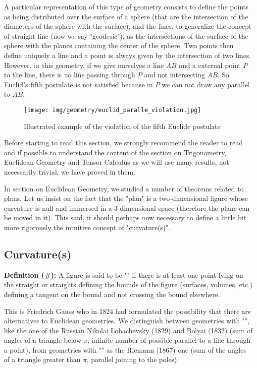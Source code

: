 	A particular representation of this type of geometry consists to define the points as being distributed over the surface of a sphere (that are the intersection of the diameters of the sphere with the surface), and the lines, to generalize the concept of straight line (now we say "geodesic"), as the intersections of the surface of the sphere with the planes containing the center of the sphere. Two points then define uniquely a line and a point is always given by the intersection of two lines. However, in this geometry, if we give ourselves a line $AB$ and a external point $P$ to the line, there is no line passing through $P$ and not intersecting $AB$. So Euclid's fifth postulate is not satisfied because in $P$ we can not draw any parallel to $AB$.
	
	\begin{figure}[H]
		\centering
		\texttt{[image: img/geometry/euclid\_paralle\_violation.jpg]}
		\caption{Illustrated example of the violation of the fifth Euclide postulate}
	\end{figure}
	
	\begin{tcolorbox}[title=Remark,colframe=black,arc=10pt]
	Before starting to read this section, we strongly recommend the reader to read and if possible to understand the content of the section on Trigonometry, Euclidean Geometry and Tensor Calculus as we will use many results, not necessarily trivial, we have proved in them.
	\end{tcolorbox}
	
	In section on Euclidean Geometry, we studied a number of theorems related to plans. Let us insist on the fact that the "plan" is a two-dimensional figure whose curvature is null and immersed in a 3-dimensional space (therefore the plane can be moved in it). This said, it should perhaps now necessary to define a little bit more rigorously the intuitive concept of "curvature(s)".
	
	\subsection{Curvature(s)}
	\textbf{Definition (\#\mydef):}	A figure is said to be "" if there is at least one point lying on the straight or straights defining the bounds of the figure (surfaces, volumes, etc.) defining a tangent on the bound and not crossing the bound elsewhere.
	
	This is Friedrich Gauss who in 1824 had formulated the possibility that there are alternatives to Euclidean geometries. We distinguish between geometries with "", like the one of the Russian Nikolai Lobachevsky (1829) and Bolyai (1832) (sum of angles of a triangle below $\pi$, infinite number of possible parallel to a line through a point), from geometries with "" as the Riemann (1867) one (sum of the angles of a triangle greater than $\pi$, parallel joining to the poles).
	
